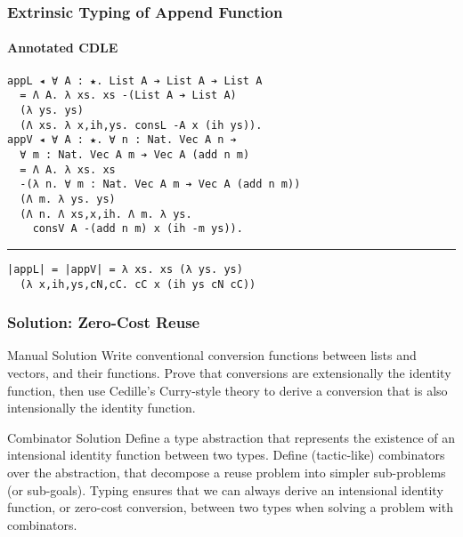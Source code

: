 \documentclass[mathserif,usenames,dvipsnames]{beamer}
\begin{document}
\begin{frame}[fragile]
\frametitle{Extrinsic Typing of Append Function}
\framesubtitle{Annotated CDLE}

\begin{verbatim}
appL ◂ ∀ A : ★. List A ➔ List A ➔ List A
  = Λ A. λ xs. xs -(List A ➔ List A)
  (λ ys. ys)
  (Λ xs. λ x,ih,ys. consL -A x (ih ys)).
appV ◂ ∀ A : ★. ∀ n : Nat. Vec A n ➔ 
  ∀ m : Nat. Vec A m ➔ Vec A (add n m)
  = Λ A. λ xs. xs 
  -(λ n. ∀ m : Nat. Vec A m ➔ Vec A (add n m))
  (Λ m. λ ys. ys)
  (Λ n. Λ xs,x,ih. Λ m. λ ys. 
    consV A -(add n m) x (ih -m ys)).
\end{verbatim}

\noindent\rule{\textwidth}{1pt}

\begin{verbatim}
|appL| = |appV| = λ xs. xs (λ ys. ys) 
  (λ x,ih,ys,cN,cC. cC x (ih ys cN cC))
\end{verbatim}

\end{frame}

\begin{frame}
\frametitle{Solution: Zero-Cost Reuse}

\begin{block}{Manual Solution}
Write conventional conversion functions between lists and vectors, and
their functions. Prove that conversions are extensionally the identity
function, then use Cedille's Curry-style theory to derive a conversion
that is also intensionally the identity function.
\end{block}

\begin{block}{Combinator Solution}
Define a type abstraction that represents the existence of an
intensional identity function between two types. Define (tactic-like)
combinators over the abstraction, that decompose a reuse problem into
simpler sub-problems (or sub-goals). Typing ensures that we can always
derive an intensional identity function, or zero-cost conversion,
between two types when solving a problem with combinators.
\end{block}

\end{frame}
\end{document}
